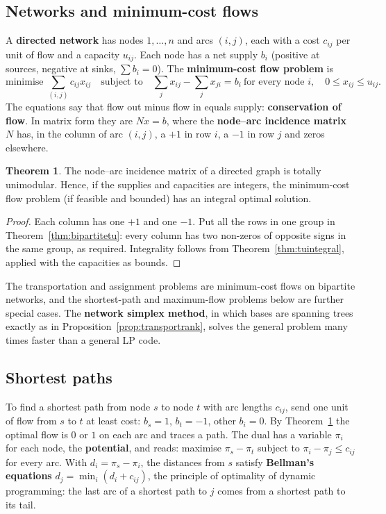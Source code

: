 \documentclass[11pt,a4paper]{article}
\numberwithin{equation}{section}
\theoremstyle{definition}
\newtheorem{thm}{Theorem}[subsection]
\begin{document}
\subsection{Networks and minimum-cost flows}
\label{ssec:mincostflow}

A \textbf{directed network} has nodes $1, \ldots, n$ and arcs $(i, j)$, each with a cost $c_{ij}$ per unit of flow and a capacity $u_{ij}$. Each node has a net supply $b_i$ (positive at sources, negative at sinks, $\sum b_i = 0$). The \textbf{minimum-cost flow problem} is
\[
\text{minimise } \sum_{(i,j)}c_{ij}x_{ij} \quad\text{subject to}\quad \sum_jx_{ij} - \sum_jx_{ji} = b_i \ \text{for every node } i, \quad 0 \leq x_{ij} \leq u_{ij} .
\]
The equations say that flow out minus flow in equals supply: \textbf{conservation of flow}. In matrix form they are $Nx = b$, where the \textbf{node--arc incidence matrix} $N$ has, in the column of arc $(i, j)$, a $+1$ in row $i$, a $-1$ in row $j$ and zeros elsewhere.

\begin{thm}
\label{thm:networktu}
The node--arc incidence matrix of a directed graph is totally unimodular. Hence, if the supplies and capacities are integers, the minimum-cost flow problem (if feasible and bounded) has an integral optimal solution.
\end{thm}

\begin{proof}
Each column has one $+1$ and one $-1$. Put all the rows in one group in Theorem~\ref{thm:bipartitetu}: every column has two non-zeros of opposite signs in the same group, as required. Integrality follows from Theorem~\ref{thm:tuintegral}, applied with the capacities as bounds.
\end{proof}

The transportation and assignment problems are minimum-cost flows on bipartite networks, and the shortest-path and maximum-flow problems below are further special cases. The \textbf{network simplex method}, in which bases are spanning trees exactly as in Proposition~\ref{prop:transportrank}, solves the general problem
many times faster than a general LP code.

\subsection{Shortest paths}
\label{ssec:shortestpath}

To find a shortest path from node $s$ to node $t$ with arc lengths $c_{ij}$, send one unit of flow from $s$ to $t$ at least cost: $b_s = 1$, $b_t = -1$, other $b_i = 0$. By Theorem~\ref{thm:networktu} the optimal flow is $0$ or $1$ on each arc and traces a path. The dual has a variable $\pi_i$ for each node, the \textbf{potential}, and
reads: maximise $\pi_s - \pi_t$ subject to $\pi_i - \pi_j \leq c_{ij}$ for every arc. With $d_i = \pi_s - \pi_i$, the distances from $s$ satisfy \textbf{Bellman's equations} $d_j = \min_i(d_i + c_{ij})$, the principle of optimality of dynamic programming: the last arc of a shortest path to $j$ comes from a shortest path to its tail.
\end{document}
